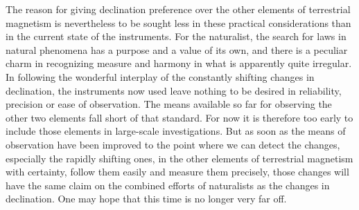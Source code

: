 The reason for giving declination preference over the other elements of terrestrial magnetism is nevertheless to be sought less in these practical considerations than in the current state of the instruments. For the naturalist, the search for laws in natural phenomena has a purpose and a value of its own, and there is a peculiar charm in recognizing measure and harmony in what is apparently quite irregular. In following the wonderful interplay of the constantly shifting changes in declination, the instruments now used leave nothing to be desired in reliability, precision or ease of observation. The means available so far for observing the other two elements fall short of that standard. For now it is therefore too early to include those elements in large-scale investigations. But as soon as the means of observation have been improved to the point where we can detect the changes, especially the rapidly shifting ones, in the other elements of terrestrial magnetism with certainty, follow them easily and measure them precisely, those changes will have the same claim on the combined efforts of naturalists as the changes in declination. One may hope that this time is no longer very far off.

